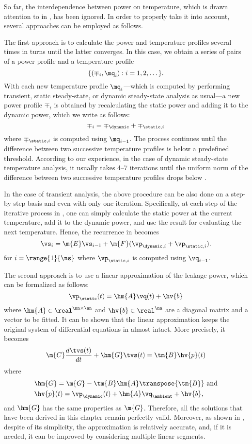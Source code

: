 So far, the interdependence between power on temperature, which is drawn
attention to in , has been ignored. In order to properly take
it into account, several approaches can be employed as follows.

The first approach is to calculate the power and temperature profiles several
times in turns until the latter converges. In this case, we obtain a series of
pairs of a power profile and a temperature profile
\[
  \{ (\mp_i, \mq_i): i = 1, 2, \dots \}.
\]
With each new temperature profile $\mq_i$---which is computed by performing
transient, static steady-state, or dynamic steady-state analysis as usual---a
new power profile $\mp_i$ is obtained by recalculating the static power and
adding it to the dynamic power, which we write as follows:
\[
  \mp_i = \mp_\dynamic + \mp_{\static, i}
\]
where $\mp_{\static, i}$ is computed using $\mq_{i - 1}$. The process continues
until the difference between two successive temperature profiles is below a
predefined threshold. According to our experience, in the case of dynamic
steady-state temperature analysis, it usually takes 4--7 iterations until the
uniform norm of the difference between two successive temperature profiles drops
below .

In the case of transient analysis, the above procedure can be also done on a
step-by-step basis and even with only one iteration. Specifically, at each step
of the iterative process in , one can simply
calculate the static power at the current temperature, add it to the dynamic
power, and use the result for evaluating the next temperature. Hence, the
recurrence in  becomes
\[
  \vs_i = \m{E} \vs_{i - 1} + \m{F} (\vp_{\dynamic, i} + \vp_{\static, i}).
\]
for $i = \range{1}{\ns}$ where $\vp_{\static, i}$ is computed using $\vq_{i -
1}$.

The second approach is to use a linear approximation of the leakage power, which
can be formalized as follows:
\[
  \vp_\static(t) = \hm{A} \vq(t) + \hv{b}
\]
where $\hm{A} \in \real^{\nn \times \nn}$ and $\hv{b} \in \real^\nn$ are a
diagonal matrix and a vector to be fitted. It can be shown that the linear
approximation keeps the original system of differential equations in
 almost intact. More precisely, it
becomes
\[
  \m{C} \frac{d\tvs(t)}{dt} + \hm{G} \tvs(t) = \tm{B} \hv{p}(t)
\]
where
\begin{align*}
  & \hm{G} = \m{G} - \tm{B} \hm{A} \transpose{\tm{B}} \text{ and} \\
  & \hv{p}(t) = \vp_\dynamic(t) + \hm{A} \vq_\ambient + \hv{b},
\end{align*}
and $\hm{G}$ has the same properties as $\m{G}$. Therefore, all the solutions
that have been derived in this chapter remain perfectly valid. Moreover, as
shown in \cite{liu2007}, despite of its simplicity, the approximation is
relatively accurate, and, if it is needed, it can be improved by considering
multiple linear segments.

